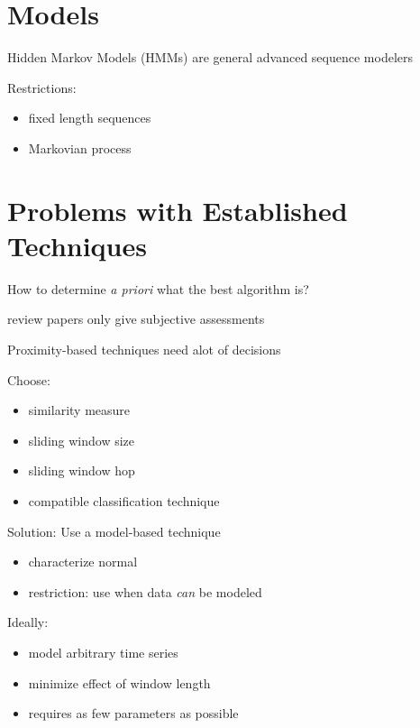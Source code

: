 \documentclass{beamer}
\begin{document}
  \section{Models}

  \begin{frame}{Hidden Markov Models (HMMs) are general advanced sequence modelers}
    
    Restrictions:
    \begin{itemize}
      \item fixed length sequences
      \item Markovian process
    \end{itemize}

  \end{frame}


  \section{Problems with Established Techniques}


  \begin{frame}{How to determine \emph{a priori} what the best algorithm is?}
    
    review papers only give subjective assessments

  \end{frame}


  \begin{frame}{Proximity-based techniques need alot of decisions}
    
    Choose:
    \begin{itemize}
      \item similarity measure
      \item sliding window size
      \item sliding window hop
      \item compatible classification technique
    \end{itemize}

  \end{frame}


  \begin{frame}{Solution: Use a model-based technique}
    
    \begin{itemize}
      \item characterize normal %
      \item restriction: use when data \emph{can} be modeled
    \end{itemize}

    Ideally:
    \begin{itemize}
      \item model arbitrary time series
      \item minimize effect of window length
      \item requires as few parameters as possible
    \end{itemize}
    

  \end{frame}



\end{document}

